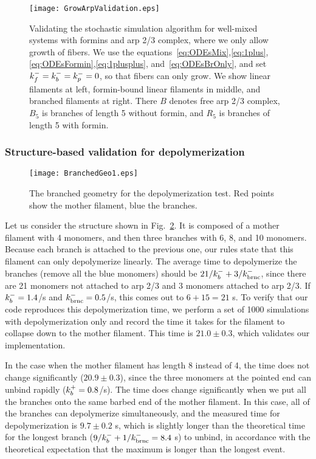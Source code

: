 \documentclass[11pt]{article}
\begin{document}
\begin{figure}
\centering
\texttt{[image: GrowArpValidation.eps]}
\caption{\label{fig:GrowArpValid}Validating the stochastic simulation algorithm for well-mixed systems with formins and arp 2/3 complex, where we only allow growth of fibers. We use the equations\ \eqref{eq:ODEsMix},\eqref{eq:1plus},\eqref{eq:ODEsFormin},\eqref{eq:1plusplus}, and\ \eqref{eq:ODEsBrOnly}, and set $k_f^-=k_b^-=k_p^-=0$, so that fibers can only grow. We show linear filaments at left, formin-bound linear filaments in middle, and branched filaments at right. There $B$ denotes free arp 2/3 complex, $B_5$ is branches of length 5 without formin, and $R_5$ is branches of length 5 with formin.  }
\end{figure}


\subsubsection{Structure-based validation for depolymerization}
\begin{figure}
\centering
\texttt{[image: BranchedGeo1.eps]}
\caption{\label{fig:BranchedGeo}The branched geometry for the depolymerization test. Red points show the mother filament, blue the branches.}
\end{figure}

Let us consider the structure shown in Fig.\ \ref{fig:BranchedGeo}. It is composed of a mother filament with 4 monomers, and then three branches with 6, 8, and 10 monomers. Because each branch is attached to the previous one, our rules state that this filament can only depolymerize linearly. The average time to depolymerize the branches (remove all the blue monomers) should be $21/k_b^-+3/k_\text{brnc}^-$, since there are 21 monomers not attached to arp 2/3 and 3 monomers attached to arp 2/3. If $k_b^-=1.4$/s and $k_\text{brnc}^-=0.5$/s, this comes out to $6+15=21$ s. To verify that our code reproduces this depolymerization time, we perform a set of 1000 simulations with depolymerization only and record the time it takes for the filament to collapse down to the mother filament. This time is $21.0 \pm 0.3$, which validates our implementation. 

In the case when the mother filament has length 8 instead of 4, the time does not change significantly ($20.9 \pm 0.3$), since the three monomers at the pointed end can unbind rapidly ($k_b^+=0.8$/s). The time does change significantly when we put all the branches onto the same barbed end of the mother filament. In this case, all of the branches can depolymerize simultaneously, and the measured time for depolymerization is $9.7 \pm 0.2$ s, which is slightly longer than the theoretical time for the longest branch ($9/k_b^-+1/k_\text{brnc}^-=8.4$ s) to unbind, in accordance with the theoretical expectation that the maximum is longer than the longest event.
\end{document}
